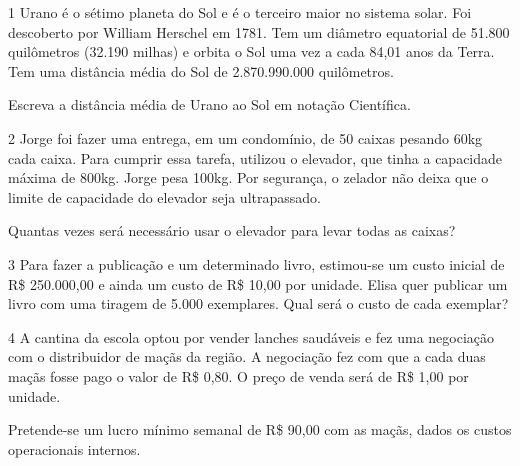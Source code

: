 \begin{escolha}
\num{1} Urano é o sétimo planeta do Sol e é o terceiro maior no sistema
solar. Foi descoberto por William Herschel em 1781. Tem um diâmetro
equatorial de 51.800 quilômetros (32.190 milhas) e orbita o Sol uma vez
a cada 84,01 anos da Terra. Tem uma distância média do Sol de
2.870.990.000 quilômetros.

Escreva a distância média de Urano ao Sol em notação Científica.

\begin{boxpeq}
\end{boxpeq}

\num{2} Jorge foi fazer uma entrega, em um condomínio, de 50 caixas
pesando 60kg cada caixa. Para cumprir essa tarefa, utilizou o elevador,
que tinha a capacidade máxima de 800kg. Jorge pesa 100kg. Por segurança,
o zelador não deixa que o limite de capacidade do elevador seja ultrapassado.

Quantas vezes será necessário usar o elevador para levar todas as
caixas?

\begin{boxmedio}
\end{boxmedio}

\num{3} Para fazer a publicação e um determinado livro, estimou-se um
custo inicial de R\$ 250.000,00 e ainda um custo de R\$ 10,00 por
unidade. Elisa quer publicar um livro com uma tiragem de 5.000
exemplares. Qual será o custo de cada exemplar?

\begin{boxmedio}
\end{boxmedio}

\num{4} A cantina da escola optou por vender lanches saudáveis e fez uma
negociação com o distribuidor de maçãs da região. A negociação fez com
que a cada duas maçãs fosse pago o valor de R\$ 0,80. O preço
de venda será de R\$ 1,00 por unidade.

Pretende-se um lucro mínimo semanal de R\$ 90,00 com as maçãs, dados os
custos operacionais internos.


\end{escolha}
